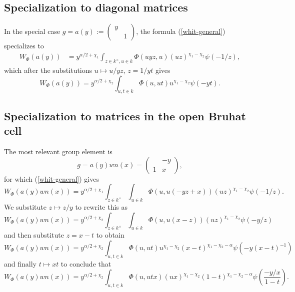 \documentclass[reqno]{amsart} 
\begin{document}
\subsection{Specialization to diagonal matrices}
\label{sec:orgc9a42d8}
In the special case $g = a(y) := \left(
  \begin{smallmatrix}
    y&\\
     &1
  \end{smallmatrix}
\right)$, the formula (\ref{whit-general}) specializes to
\begin{align*}
  W_\Phi(a(y))
  &=
    y^{\alpha/2+\chi_1}
    \int_{z \in k^\times, u \in k}
    \Phi(u y z, u) (u z)^{\chi_1 - \chi_2} \psi(-1 / z),
\end{align*}
which after the substitutions $u \mapsto u / y z$, $z = 1/ y t$ gives
\begin{equation}\label{eq:whittaker-diag}
  W_\Phi(a(y))
  = y^{\alpha/2 + \chi_2}
  \int_{u,t \in k}
  \Phi(u, u t) u^{\chi_1 - \chi_2} \psi( - y t ).
\end{equation}

\subsection{Specialization to matrices in the open Bruhat cell}
The most relevant group element is
\begin{equation*}
  g = a(y) w n(x)
  =
  \begin{pmatrix}
    & -y \\
    1 & x
  \end{pmatrix}
  ,
\end{equation*}
for which (\ref{whit-general}) gives
\begin{equation*}
  W_\Phi(a(y) w n(x))
  =
  y^{\alpha/2+\chi_1}
  \int_{z \in k^\times}
  \int _{u \in k}
  \Phi (u, u(-y z + x))
  (u z)^{\chi_1-\chi_2} \psi(- 1/z).
\end{equation*} 
We substitute $z \mapsto z/y$ to rewrite this as
\begin{equation*}
  W_\Phi(a(y) w n(x))
  =
  y^{\alpha/2+\chi_2}
  \int_{z \in k^\times}
  \int _{u \in k}
  \Phi (u, u(x-z))
  (u z)^{\chi_1-\chi_2} \psi(- y/z)
\end{equation*}
and then substitute $z = x - t$ to obtain
\begin{equation*}
  W_\Phi(a(y) w n(x))
  =
  y^{\alpha/2+\chi_2}
  \int_{u,t \in k}
  \Phi (u, u t)
  u^{\chi_1-\chi_2}
  (x-t)^{\chi_1-\chi_2 - \alpha }
  \psi(-y (x-t)^{-1})
\end{equation*}
and finally $t \mapsto x t$ to conclude that
\begin{equation}\label{whit-open}
  W_\Phi(a(y) w n(x))
  = y^{\alpha/2 + \chi_2}
  \int_{u,t \in k}
  \Phi(u, u t x) (u x)^{\chi_1 - \chi_2} ( 1 - t)^{\chi_1 -
    \chi_2 - \alpha} 
  \psi \left( \frac{-y /x}{1 - t} \right).
\end{equation}
\end{document}
